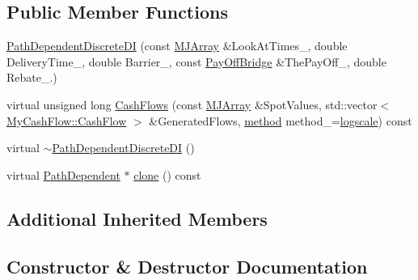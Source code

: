\subsection*{Public Member Functions}
\begin{DoxyCompactItemize}
\item 
\hyperlink{classPathDependentDiscreteDI_a06f5b004891beb61e146b721baff8f50}{Path\+Dependent\+Discrete\+DI} (const \hyperlink{classMJArray}{M\+J\+Array} \&Look\+At\+Times\+\_\+, double Delivery\+Time\+\_\+, double Barrier\+\_\+, const \hyperlink{classPayOffBridge}{Pay\+Off\+Bridge} \&The\+Pay\+Off\+\_\+, double Rebate\+\_.)
\item 
virtual unsigned long \hyperlink{classPathDependentDiscreteDI_a42183f0f6276fedf39a9314009d8846c}{Cash\+Flows} (const \hyperlink{classMJArray}{M\+J\+Array} \&Spot\+Values, std\+::vector$<$ \hyperlink{classMyCashFlow_1_1CashFlow}{My\+Cash\+Flow\+::\+Cash\+Flow} $>$ \&Generated\+Flows, \hyperlink{PathDependent_8h_abed946c62f140eb7ff2ac742e6ad9497}{method} method\+\_\+=\hyperlink{PathDependent_8h_abed946c62f140eb7ff2ac742e6ad9497a064d3d3358889658ce07fe9f3191d1fd}{logscale}) const
\item 
virtual \hyperlink{classPathDependentDiscreteDI_ab8f1cfbf5bb7e52740bcc31dc9f889f4}{$\sim$\+Path\+Dependent\+Discrete\+DI} ()
\item 
virtual \hyperlink{classPathDependent}{Path\+Dependent} $\ast$ \hyperlink{classPathDependentDiscreteDI_a9b5ac8d8a7562e75a07c31e031586a16}{clone} () const
\end{DoxyCompactItemize}
\subsection*{Additional Inherited Members}


\subsection{Constructor \& Destructor Documentation}
\hypertarget{classPathDependentDiscreteDI_a06f5b004891beb61e146b721baff8f50}{}\label{classPathDependentDiscreteDI_a06f5b004891beb61e146b721baff8f50} 
